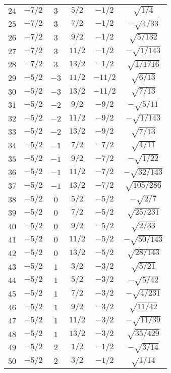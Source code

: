 \begin{table}
\begin{center}
\begin{tabular}{|c|c|c|c|c|c|}
$24$ & $-7/2$ & $3$ & $5/2$ & $-1/2$ & $\sqrt{1/4}$ \\ 
$25$ & $-7/2$ & $3$ & $7/2$ & $-1/2$ & $-\sqrt{4/33}$ \\ 
$26$ & $-7/2$ & $3$ & $9/2$ & $-1/2$ & $\sqrt{5/132}$ \\ 
$27$ & $-7/2$ & $3$ & $11/2$ & $-1/2$ & $-\sqrt{1/143}$ \\ 
$28$ & $-7/2$ & $3$ & $13/2$ & $-1/2$ & $\sqrt{1/1716}$ \\ 
$29$ & $-5/2$ & $-3$ & $11/2$ & $-11/2$ & $\sqrt{6/13}$ \\ 
$30$ & $-5/2$ & $-3$ & $13/2$ & $-11/2$ & $\sqrt{7/13}$ \\ 
$31$ & $-5/2$ & $-2$ & $9/2$ & $-9/2$ & $-\sqrt{5/11}$ \\ 
$32$ & $-5/2$ & $-2$ & $11/2$ & $-9/2$ & $-\sqrt{1/143}$ \\ 
$33$ & $-5/2$ & $-2$ & $13/2$ & $-9/2$ & $\sqrt{7/13}$ \\ 
$34$ & $-5/2$ & $-1$ & $7/2$ & $-7/2$ & $\sqrt{4/11}$ \\ 
$35$ & $-5/2$ & $-1$ & $9/2$ & $-7/2$ & $-\sqrt{1/22}$ \\ 
$36$ & $-5/2$ & $-1$ & $11/2$ & $-7/2$ & $-\sqrt{32/143}$ \\ 
$37$ & $-5/2$ & $-1$ & $13/2$ & $-7/2$ & $\sqrt{105/286}$ \\ 
$38$ & $-5/2$ & $0$ & $5/2$ & $-5/2$ & $-\sqrt{2/7}$ \\ 
$39$ & $-5/2$ & $0$ & $7/2$ & $-5/2$ & $\sqrt{25/231}$ \\ 
$40$ & $-5/2$ & $0$ & $9/2$ & $-5/2$ & $\sqrt{2/33}$ \\ 
$41$ & $-5/2$ & $0$ & $11/2$ & $-5/2$ & $-\sqrt{50/143}$ \\ 
$42$ & $-5/2$ & $0$ & $13/2$ & $-5/2$ & $\sqrt{28/143}$ \\ 
$43$ & $-5/2$ & $1$ & $3/2$ & $-3/2$ & $\sqrt{5/21}$ \\ 
$44$ & $-5/2$ & $1$ & $5/2$ & $-3/2$ & $-\sqrt{5/42}$ \\ 
$45$ & $-5/2$ & $1$ & $7/2$ & $-3/2$ & $-\sqrt{4/231}$ \\ 
$46$ & $-5/2$ & $1$ & $9/2$ & $-3/2$ & $\sqrt{11/42}$ \\ 
$47$ & $-5/2$ & $1$ & $11/2$ & $-3/2$ & $-\sqrt{11/39}$ \\ 
$48$ & $-5/2$ & $1$ & $13/2$ & $-3/2$ & $\sqrt{35/429}$ \\ 
$49$ & $-5/2$ & $2$ & $1/2$ & $-1/2$ & $-\sqrt{3/14}$ \\ 
$50$ & $-5/2$ & $2$ & $3/2$ & $-1/2$ & $\sqrt{1/14}$ \\ 

\end{tabular}
\end{center}
\end{table}
